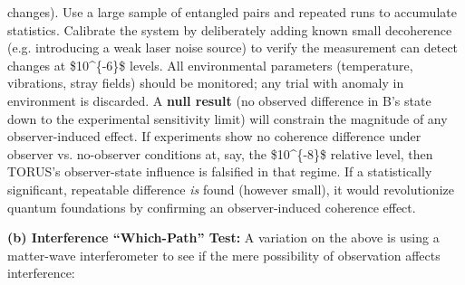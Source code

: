\documentclass[]{article}
\begin{document}
{\begin{enumerate}
  changes)​. Use a large sample of entangled pairs and repeated runs to
  accumulate statistics. Calibrate the system by deliberately adding
  known small decoherence (e.g. introducing a weak laser noise source)
  to verify the measurement can detect changes at \$10\^{}\{-6\}\$
  levels. All environmental parameters (temperature, vibrations, stray
  fields) should be monitored; any trial with anomaly in environment is
  discarded. A \textbf{null result} (no observed difference in B's state
  down to the experimental sensitivity limit) will constrain the
  magnitude of any observer-induced effect. If experiments show no
  coherence difference under observer vs. no-observer conditions at,
  say, the \$10\^{}\{-8\}\$ relative level, then TORUS's observer-state
  influence is falsified in that regime​. If a statistically
  significant, repeatable difference \emph{is} found (however small), it
  would revolutionize quantum foundations by confirming an
  observer-induced coherence effect​.
\end{enumerate}

\textbf{(b) Interference ``Which-Path'' Test:} A variation on the above
is using a matter-wave interferometer to see if the mere possibility of
observation affects interference:

}
\end{document}
